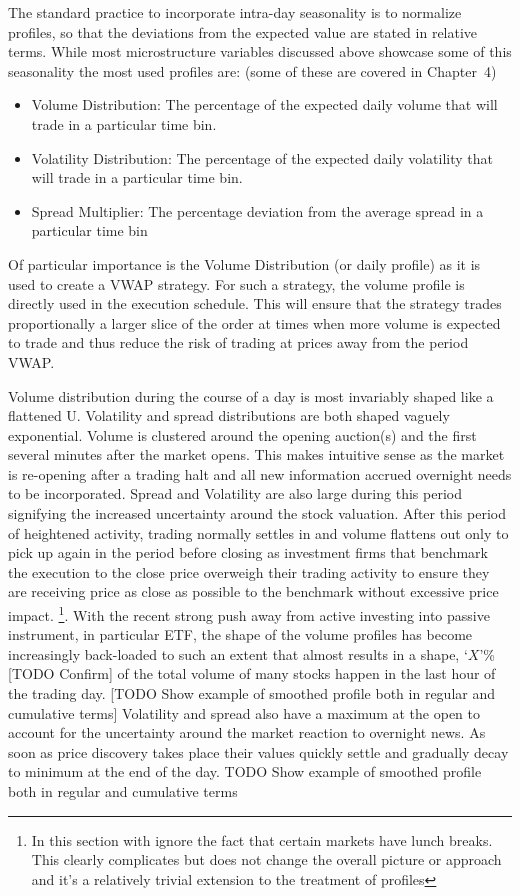   
The standard practice to incorporate intra-day seasonality is to normalize profiles, so that the deviations from the expected value are stated in relative terms. While most microstructure variables discussed above showcase some of this seasonality the most used profiles are: (some of these are covered in Chapter~4)
	\begin{itemize}
	\item Volume Distribution: The percentage of the expected daily volume that will trade in a particular time bin.
	\item Volatility Distribution: The percentage of the expected daily volatility that will trade in a particular time bin.
	\item Spread Multiplier: The percentage deviation from the average spread in a particular time bin
	\end{itemize}
Of particular importance is the Volume Distribution (or daily profile) as it is used to create a VWAP strategy. For such a strategy, the volume profile is directly used in the execution schedule. This will ensure that the strategy trades proportionally a larger slice of the order at times when more  volume is expected to trade and thus reduce the risk of trading at prices away from the period VWAP.


Volume distribution during the course of a day is most invariably shaped like a flattened U. Volatility and spread distributions are both shaped vaguely exponential. Volume is clustered around the opening auction(s) and the first several minutes after the market opens. This makes intuitive sense as the market is re-opening after a trading halt and all new information accrued overnight needs to be incorporated. Spread and Volatility are also large during this period signifying the increased uncertainty around the stock valuation. After this period of heightened activity,  trading normally settles in and volume flattens out only to pick up again in the period before closing as investment firms that benchmark the execution to the close price overweigh their trading activity to ensure they are receiving price as close as possible to the benchmark without excessive price impact. 
\footnote{In this section with ignore the fact that certain markets have lunch breaks. This clearly complicates but does not change the overall picture or approach and it's a relatively trivial extension to the treatment of profiles}. With the recent strong push away from active investing into passive instrument, in particular ETF, the shape of the volume profiles has become increasingly back-loaded to such an extent that almost results in a shape, `$X$'\%  [TODO Confirm] of the total volume of many stocks happen in the last hour of the trading day. [TODO Show example of smoothed profile both in regular and cumulative terms] Volatility and spread also have a maximum at the open to account for the uncertainty around the market reaction to  overnight news. As soon as price discovery takes place their values quickly settle and gradually decay to minimum at the end of the day. TODO Show example of smoothed profile both in regular and cumulative terms \\

